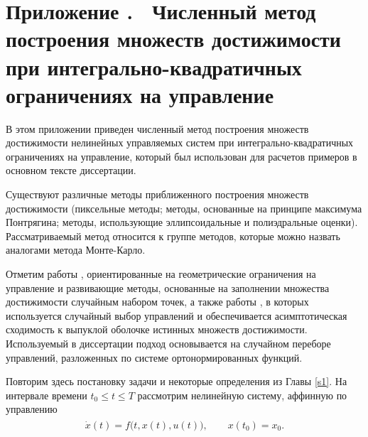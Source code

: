 \documentclass[../main.tex]{subfiles}
\begin{document}
\clearpage
\setcounter{section}{0}%
\renewcommand{\thesection}{\Alph{section}}%
\section*{Приложение .  Численный метод построения множеств достижимости при интегрально-квадратичных ограничениях на управление}%
\label{app:A}%
\renewcommand{\theequation}{\Alph{section}.\arabic{equation}}%
\setcounter{equation}{0}
  В этом приложении приведен численный метод построения множеств достижимости нелинейных управляемых систем при интегрально-квадратичных ограничениях на управление, который был использован для расчетов примеров в основном тексте диссертации.  
  
  
  Существуют различные методы приближенного построения  множеств достижимости (пиксельные методы; методы, основанные на принципе максимума Понтрягина; методы, использующие эллипсоидальные и полиэдральные оценки).  
  Рассматриваемый метод относится к группе методов, которые можно назвать аналогами метода Монте-Карло. 
   
  Отметим работы \cite{Gornov2015, Gornov2017}, ориентированные на геометрические ограничения на управление и развивающие методы, основанные на заполнении множества достижимости случайным набором точек, а также работы \cite{Lew2020, Lew2022}, в которых используется случайный выбор управлений и обеспечивается асимптотическая сходимость к выпуклой оболочке истинных множеств достижимости.
  Используемый в диссертации подход основывается на случайном переборе управлений, разложенных по системе ортонормированных функций.
  
  Повторим здесь постановку задачи и некоторые определения из Главы \ref{s1}.
  На интервале времени $ t_0 \leqslant t \leqslant {T} $ рассмотрим нелинейную систему, аффинную по управлению
  \begin{gather}\label{a1:common_nonlinear}
  	\begin{gathered}
  		\dot{x}(t)=f\big(t, x(t), u(t)\big), \qquad x(t_0) = x_0.
  	\end{gathered}
  \end{gather}
  
\end{document}
